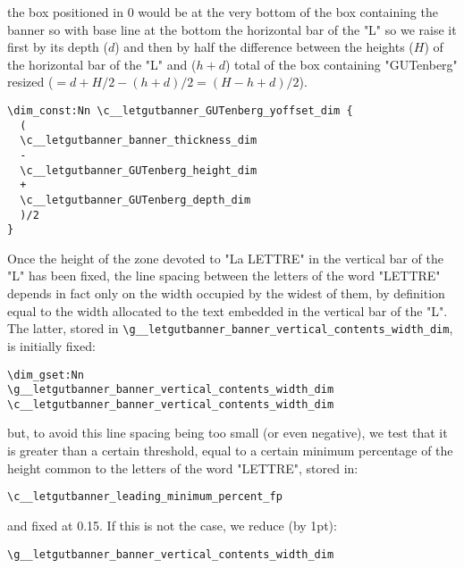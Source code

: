 \documentclass{letgut}
\begin{document}
the box positioned in \(0\) would be at the very bottom of the box containing the
banner so with base line at the bottom the horizontal bar of the "L" so we raise
it first by its depth (\(d\)) and then by half the difference between the heights
(\(H\)) of the horizontal bar of the "L" and (\(h+d\)) total of the box containing
"GUTenberg" resized (\(=d+H/2-(h+d)/2=(H-h+d)/2\)).
\begin{lstlisting}
\dim_const:Nn \c__letgutbanner_GUTenberg_yoffset_dim {
  (
  \c__letgutbanner_banner_thickness_dim
  -
  \c__letgutbanner_GUTenberg_height_dim
  +
  \c__letgutbanner_GUTenberg_depth_dim
  )/2
}
\end{lstlisting}
Once the height of the zone devoted to "La LETTRE" in the vertical bar of the
"L" has been fixed, the line spacing between the letters of the word "LETTRE"
depends in fact only on the width occupied by the widest of them, by definition
equal to the width allocated to the text embedded in the vertical bar of the
"L". The latter, stored in \lstinline+\g__letgutbanner_banner_vertical_contents_width_dim+, is
initially fixed:
\begin{lstlisting}
\dim_gset:Nn
\g__letgutbanner_banner_vertical_contents_width_dim
\c__letgutbanner_banner_vertical_contents_width_dim
\end{lstlisting}
but, to avoid this line spacing being too small (or even negative), we test that
it is greater than a certain threshold, equal to a certain minimum percentage of
the height common to the letters of the word "LETTRE", stored in:

\lstinline+\c__letgutbanner_leading_minimum_percent_fp+

and fixed at 0.15. If this is not the
case, we reduce (by 1pt):

\lstinline+\g__letgutbanner_banner_vertical_contents_width_dim+
\end{document}
